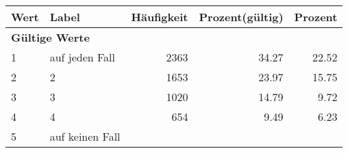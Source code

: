      \begin{longtable}{lXrrr}
     \toprule
     \textbf{Wert} & \textbf{Label} & \textbf{Häufigkeit} & \textbf{Prozent(gültig)} & \textbf{Prozent} \\
     \endhead
     \midrule
     \multicolumn{5}{l}{\textbf{Gültige Werte}}\\

     1 &
     \multicolumn{1}{X}{ auf jeden Fall   } &


       \num{2363} &
       \num[round-mode=places,round-precision=2]{34.27} &
         \num[round-mode=places,round-precision=2]{22.52} \\

     2 &
     \multicolumn{1}{X}{ 2   } &


       \num{1653} &
       \num[round-mode=places,round-precision=2]{23.97} &
         \num[round-mode=places,round-precision=2]{15.75} \\

     3 &
     \multicolumn{1}{X}{ 3   } &


       \num{1020} &
       \num[round-mode=places,round-precision=2]{14.79} &
         \num[round-mode=places,round-precision=2]{9.72} \\

     4 &
     \multicolumn{1}{X}{ 4   } &


       \num{654} &
       \num[round-mode=places,round-precision=2]{9.49} &
         \num[round-mode=places,round-precision=2]{6.23} \\

     5 &
     \multicolumn{1}{X}{ auf keinen Fall   } &



\end{longtable}
